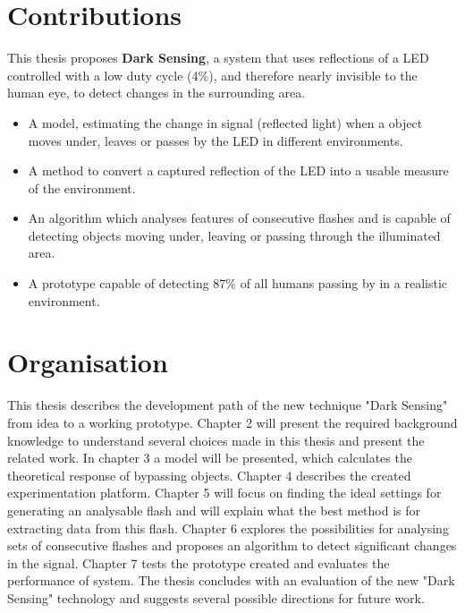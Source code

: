 \section{Contributions}
\label{sec:Contributions}
This thesis proposes \textbf{Dark Sensing}, a system that uses reflections of a LED controlled with a low duty cycle (4\%), and therefore nearly invisible to the human eye, to detect changes in the surrounding area.
\begin{itemize}\itemsep2pt
	\item A model, estimating the change in signal (reflected light) when a object moves under, leaves or passes by the LED in different environments.
	\item A method to convert a captured reflection of the LED into a usable measure of the environment.
	\item An algorithm which analyses features of consecutive flashes and is capable of detecting objects moving under, leaving or passing through the illuminated area.
	\item A prototype capable of detecting 87\% of all humans passing by in a realistic environment.
\end{itemize}

\section{Organisation}
This thesis describes the development path of the new technique "Dark Sensing" from idea to a working prototype. Chapter 2 will present the required background knowledge to understand several choices made in this thesis and present the related work. In chapter 3 a model will be presented, which calculates the theoretical response of bypassing objects. Chapter 4 describes the created experimentation platform. Chapter 5 will focus on finding the ideal settings for generating an analysable flash and will explain what the best method is for extracting data from this flash. Chapter 6 explores the possibilities for analysing sets of consecutive flashes and proposes an algorithm to detect significant changes in the signal. Chapter 7 tests the prototype created and evaluates the performance of system. The thesis concludes with an evaluation of the new "Dark Sensing" technology and suggests several possible directions for future work.